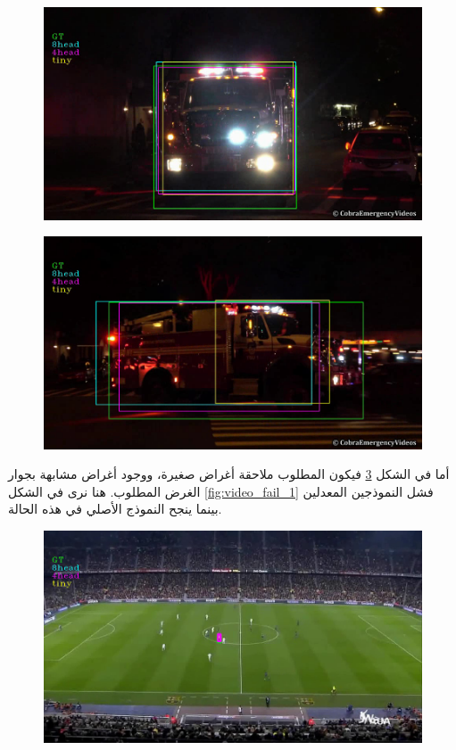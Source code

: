 \begin{figure}[H]
	\centerline{\includegraphics[width=\textwidth]{images/results/success/project_1802}}
	\caption{}
	\label{fig:video_success_3_initial}
\end{figure}

\begin{figure}[H]
	\centerline{\includegraphics[width=\textwidth]{images/results/success/project_180}}
	\caption{}
	\label{fig:video_success_3}
\end{figure}
أما في الشكل
	\ref{fig:video_fail_1_initial}
	فيكون المطلوب ملاحقة أغراض صغيرة، ووجود أغراض مشابهة بجوار الغرض المطلوب.
	هنا نرى في الشكل 
	\ref{fig:video_fail_1}
	فشل النموذجين المعدلين بينما ينجح النموذج الأصلي في هذه الحالة.
\begin{figure}[H]
	\centerline{\includegraphics[width=\textwidth]{images/results/failed/project_175.avi}}
	\caption{}
	\label{fig:video_fail_1_initial}
\end{figure}

